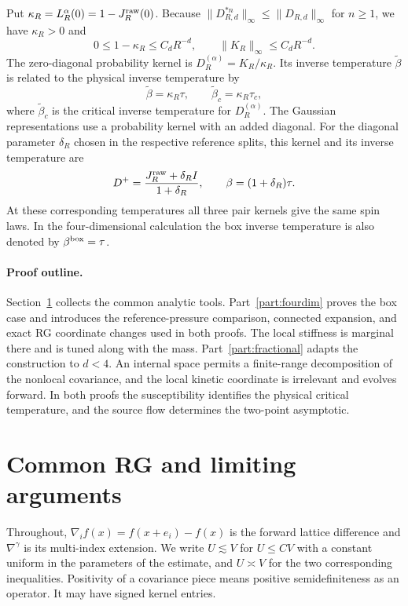 \documentclass[11pt]{article}
\begin{document}
Put \(\kappa_R=L_R^\alpha(0)=1-J_R^{\rm raw}(0)\). Because
\(\|D_{R,d}^{*n}\|_\infty\le\|D_{R,d}\|_\infty\) for \(n\ge1\),
we have \(\kappa_R>0\) and
\[
 0\le1-\kappa_R\le C_dR^{-d},\qquad
 \|K_R\|_\infty\le C_dR^{-d}.
\]
The zero-diagonal probability kernel is \(D_R^{(\alpha)}=K_R/\kappa_R\).
Its inverse temperature \(\widetilde\beta\) is related to the
physical inverse temperature by
\begin{equation}\label{frac:normalization}
 \widetilde\beta=\kappa_R\tau,
 \qquad \widetilde\beta_c=\kappa_R\tau_c,
\end{equation}
where \(\widetilde\beta_c\) is the critical inverse temperature for
\(D_R^{(\alpha)}\).
The Gaussian representations use a probability kernel with
an added diagonal. For the diagonal parameter \(\delta_R\)
chosen in the respective reference splits, this kernel and its inverse
temperature are
\[
 D^+=\frac{J_R^{\rm raw}+\delta_R I}{1+\delta_R},
 \qquad \beta=(1+\delta_R)\tau .
\]
At these corresponding temperatures all three pair kernels give the
same spin laws. In the four-dimensional calculation the box inverse
temperature is also denoted by \(\beta^{\rm box}=\tau\).

\paragraph{Proof outline.}
Section~\ref{sec:shared-rg} collects the common analytic tools.
Part~\ref{part:fourdim} proves the box case and introduces the
reference-pressure comparison, connected expansion, and exact RG
coordinate changes used in both proofs. The local stiffness is
marginal there and is tuned along with the mass.
Part~\ref{part:fractional} adapts the construction to \(d<4\).
An internal space permits a finite-range decomposition of the
nonlocal covariance, and the local kinetic coordinate is irrelevant
and evolves forward. In both proofs the susceptibility identifies
the physical critical temperature, and the source flow determines
the two-point asymptotic.

\setcounter{tocdepth}{1}
\tableofcontents
\clearpage

\section{Common RG and limiting arguments}\label{sec:shared-rg}

Throughout, \(\nabla_i f(x)=f(x+e_i)-f(x)\) is the forward
lattice difference and \(\nabla^\gamma\) is its multi-index
extension. We write \(U\lesssim V\) for \(U\le CV\) with a
constant uniform in the parameters of the estimate, and
\(U\asymp V\) for the two corresponding inequalities.
Positivity of a covariance piece means positive semidefiniteness
as an operator. It may have signed kernel entries.
\end{document}
